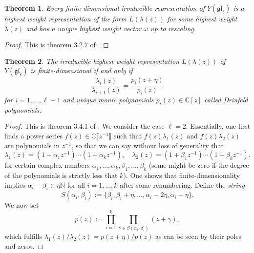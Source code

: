 \documentclass[11pt]{report}
\newtheorem{theorem}{Theorem}[section]
\theoremstyle{definition}
\theoremstyle{remark}
\theoremstyle{remark}
\newcommand{\N}{\mathbb{N}}
\newcommand{\C}{\mathbb{C}}
\begin{document}
\begin{theorem}
Every finite-dimensional irreducible representation of $Y(\mathfrak{gl}_\ell)$ is a highest weight representation of the form $L(\lambda(z))$ for some highest weight $\lambda(z)$ and has a unique highest weight vector $\omega$ up to rescaling.
\end{theorem}

\begin{proof}
This is theorem 3.2.7 of \cite{book:molev}.
\end{proof}

\begin{theorem}
The irreducible highest weight representation $L(\lambda(z))$ of $Y(\mathfrak{gl}_\ell)$ is finite-dimensional if and only if
\begin{equation*}
\frac{\lambda_i(z)}{\lambda_{i+1}(z)} = \frac{p_i(z+\eta)}{p_i(z)}
\end{equation*}
for $i=1,...,\ell-1$ and unique monic polynomials $p_i(z) \in \C[z]$ called \emph{Drinfeld polynomials}.
\end{theorem}

\begin{proof}
This is theorem 3.4.1 of \cite{book:molev}. We consider the case $\ell = 2$. Essentially, one first finds a power series $f(z) \in \C\llbracket z^{-1} \rrbracket$ such that $f(z) \lambda_1(z)$ and $f(z) \lambda_2(z)$ are polynomials in $z^{-1}$, so that we can say without loss of generality that
\begin{equation*}
\lambda_1(z) = (1+\alpha_1 z^{-1}) \cdots (1+\alpha_k z^{-1}), \quad \lambda_2(z) = (1+\beta_1 z^{-1}) \cdots (1+\beta_k z^{-1}).
\end{equation*}
for certain complex numbers $\alpha_1,...,\alpha_k,\beta_1,...,\beta_k$ (some might be zero if the degree of the polynomials is strictly less that $k$). One shows that finite-dimensionality implies $\alpha_i - \beta_i \in \eta\N$ for all $i=1,...,k$ after some renumbering. Define the \emph{string}
\begin{equation*}
S(\alpha_i,\beta_i) := \{ \beta_i, \beta_i+\eta, ..., \alpha_i-2\eta, \alpha_i-\eta \}.
\end{equation*}
We now set
\begin{equation*}
p(z) := \prod_{i=1}^k \prod_{\gamma \in S(\alpha_i,\beta_i)} (z + \gamma),
\end{equation*}
which fulfills $\lambda_1(z) / \lambda_2(z) = p(z+\eta) / p(z)$ as can be seen by their poles and zeros.
\end{proof}
\end{document}
